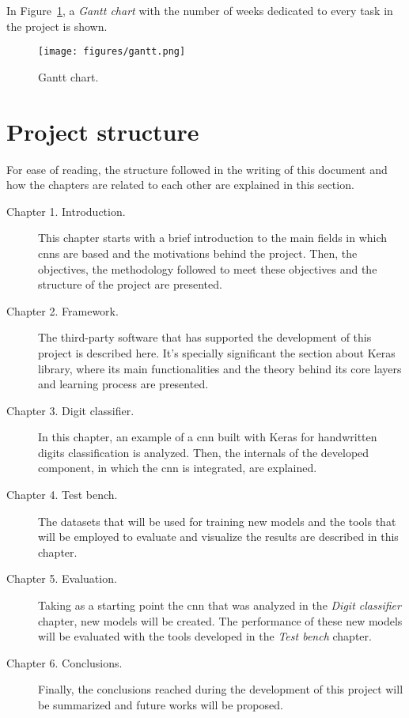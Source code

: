 In Figure~\ref{fig:gantt}, a \emph{Gantt chart} with the number of weeks dedicated to every task in the project is shown.
\begin{figure}
	\centering
	\texttt{[image: figures/gantt.png]}
	\caption{Gantt chart.}
	\label{fig:gantt}
\end{figure}

\section{Project structure}
For ease of reading, the structure followed in the writing of this document and how the chapters are related to each other are explained in this section.

\begin{description}
	\item[Chapter 1. Introduction.] This chapter starts with a brief introduction to the main fields in which \glspl{cnn} are based and the motivations behind the project. Then, the objectives, the methodology followed to meet these objectives and the structure of the project are presented.
	\item[Chapter 2. Framework.] The third-party software that has supported the development of this project is described here. It's specially significant the section about Keras library, where its main functionalities and the theory behind its core layers and learning process are presented.
	\item[Chapter 3. Digit classifier.] In this chapter, an example of a \gls{cnn} built with Keras for handwritten digits classification is analyzed. Then, the internals of the developed component, in which the \gls{cnn} is integrated, are explained.
	\item[Chapter 4. Test bench.] The datasets that will be used for training new models and the tools that will be employed to evaluate and visualize the results are described in this chapter.
	\item[Chapter 5. Evaluation.] Taking as a starting point the \gls{cnn} that was analyzed in the \textit{Digit classifier} chapter, new models will be created. The performance of these new models will be evaluated with the tools developed in the \textit{Test bench} chapter.
	\item[Chapter 6. Conclusions.] Finally, the conclusions reached during the development of this project will be summarized and future works will be proposed.
\end{description}

